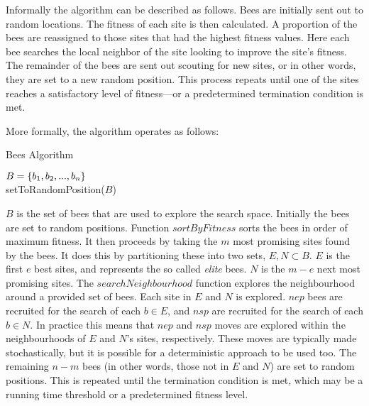 
Informally the algorithm can be described as follows. Bees are initially sent out to random locations. The fitness of each site is then calculated. A proportion of the bees are reassigned to those sites that had the highest fitness values. Here each bee searches the local neighbor of the site looking to improve the site's fitness. The remainder of the bees are sent out scouting for new sites, or in other words, they are set to a new random position. This process repeats until one of the sites reaches a satisfactory level of fitness---or a predetermined termination condition is met.

More formally, the algorithm operates as follows:

\begin{algorithm}[H]
   \caption{Bees Algorithm}
   $B = \{b_1, b_2,..., b_n\}$\\
   setToRandomPosition($B$)\\
\end{algorithm}

$B$ is the set of bees that are used to explore the search space. Initially the bees are set to random positions. Function $sortByFitness$ sorts the bees in order of maximum fitness. It then proceeds by taking the $m$ most promising sites found by the bees. It does this by partitioning these into two sets, $E, N \subset B$. $E$ is the first $e$ best sites, and represents the so called \emph{elite} bees. $N$ is the $m - e$ next most promising sites. The $searchNeighbourhood$ function explores the neighbourhood around a provided set of bees. Each site in $E$ and $N$ is explored. $nep$ bees are recruited for the search of each $b \in E$, and $nsp$ are recruited for the search of each $b \in N$. In practice this means that $nep$ and $nsp$ moves are explored within the neighbourhoods of $E$ and $N$'s sites, respectively. These moves are typically made stochastically, but it is possible for a deterministic approach to be used too. The remaining $n - m$ bees (in other words, those not in $E$ and $N$) are set to random positions. This is repeated until the termination condition is met, which may be a running time threshold or a predetermined fitness level. 

